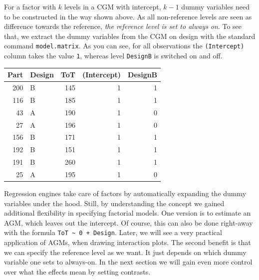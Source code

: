 \documentclass[]{svmono}
\newenvironment{Shaded}{\begin{snugshade}}{\end{snugshade}}
\newcommand{\KeywordTok}[1]{\textcolor[rgb]{0.13,0.29,0.53}{\textbf{#1}}}
\newcommand{\DecValTok}[1]{\textcolor[rgb]{0.00,0.00,0.81}{#1}}
\newcommand{\StringTok}[1]{\textcolor[rgb]{0.31,0.60,0.02}{#1}}
\newcommand{\OperatorTok}[1]{\textcolor[rgb]{0.81,0.36,0.00}{\textbf{#1}}}
\newcommand{\NormalTok}[1]{#1}
\begin{document}
For a factor with \(k\) levels in a CGM with intercept, \(k-1\) dummy
variables need to be constructed in the way shown above. As all
non-reference levels are seen as difference towards the reference,
\emph{the reference level is set to always on}. To see that, we extract
the dummy variables from the CGM on design with the standard command
\texttt{model.matrix}. As you can see, for all observations the
\texttt{(Intercept)} column takes the value \texttt{1}, whereas level
\texttt{DesignB} is switched on and off.

\begin{Shaded}
\end{Shaded}

\begin{tabular}{r|l|r|r|r}
\hline
Part & Design & ToT & (Intercept) & DesignB\\
\hline
200 & B & 145 & 1 & 1\\
\hline
116 & B & 185 & 1 & 1\\
\hline
43 & A & 190 & 1 & 0\\
\hline
27 & A & 196 & 1 & 0\\
\hline
156 & B & 171 & 1 & 1\\
\hline
192 & B & 151 & 1 & 1\\
\hline
191 & B & 260 & 1 & 1\\
\hline
25 & A & 195 & 1 & 0\\
\hline
\end{tabular}

Regression engines take care of factors by automatically expanding the
dummy variables under the hood. Still, by understanding the concept we
gained additional flexibility in specifying factorial models. One
version is to estimate an AGM, which leaves out the intercept. Of
course, this can also be done right-away with the formula
\texttt{ToT\ \textasciitilde{}\ 0\ +\ Design}. Later, we will see a very
practical application of AGMs, when drawing interaction plots. The
second benefit is that we can specify the reference level as we want. It
just depends on which dummy variable one sets to always-on. In the next
section we will gain even more control over what the effects mean by
setting contrasts.
\end{document}
